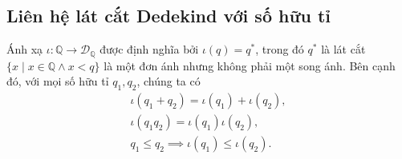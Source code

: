 \subsection{Liên hệ lát cắt Dedekind với số hữu tỉ}

\begin{theorem}\label{theorem:embed-Q-into-the-set-of-dedekind-cuts}
    Ánh xạ $\iota: \mathbb{Q}\to \mathscr{D}_{\mathbb{Q}}$ được định nghĩa bởi $\iota(q) = q^{*}$, trong đó $q^{*}$ là lát cắt $\{ x \mid x\in\mathbb{Q} \wedge x < q \}$ là một đơn ánh nhưng không phải một song ánh. Bên cạnh đó, với mọi số hữu tỉ $q_{1}, q_{2}$, chúng ta có
    \[
        \begin{split}
            \iota(q_{1} + q_{2}) = \iota(q_{1}) + \iota(q_{2}), \\
            \iota(q_{1}q_{2}) = \iota(q_{1})\iota(q_{2}), \\
            q_{1}\leq q_{2} \implies \iota(q_{1})\leq \iota(q_{2}).
        \end{split}
    \]
\end{theorem}

